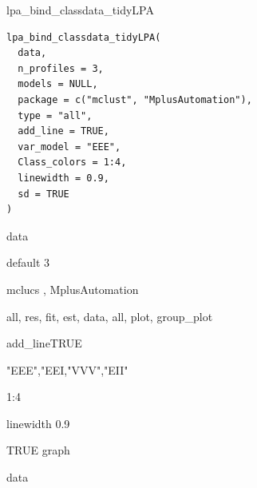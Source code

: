 \documentclass[a4paper]{book}
\begin{document}
%
\begin{Description}
lpa\_bind\_classdata\_tidyLPA
\end{Description}
%
\begin{Usage}
\begin{verbatim}
lpa_bind_classdata_tidyLPA(
  data,
  n_profiles = 3,
  models = NULL,
  package = c("mclust", "MplusAutomation"),
  type = "all",
  add_line = TRUE,
  var_model = "EEE",
  Class_colors = 1:4,
  linewidth = 0.9,
  sd = TRUE
)
\end{verbatim}
\end{Usage}
%
\begin{Arguments}
\begin{ldescription}
\item[\code{data}] data

\item[\code{n\_profiles}] default 3

\item[\code{package}] mclucs , MplusAutomation

\item[\code{type}] all, res, fit, est, data, all, plot, group\_plot

\item[\code{add\_line}] add\_lineTRUE

\item[\code{var\_model}] "EEE","EEI,"VVV","EII"

\item[\code{Class\_colors}] 1:4

\item[\code{linewidth}] linewidth 0.9

\item[\code{sd}] TRUE graph
\end{ldescription}
\end{Arguments}
%
\begin{Value}
data
\end{Value}
%
\end{document}
